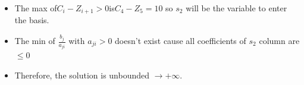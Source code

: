 \vspace{0.25cm}
\begin{itemize}   
\item The max of\hspace{0.2cm}\(C_i - Z_{i+1} > 0\)\hspace{0.2cm}is\hspace{0.2cm}\(C_4 - Z_5 = 10\)\hspace{0.1cm} so \(s_2\) 
will be the variable to enter the basis.
\item The min of \hspace{0.1cm}\(\frac{b_j}{a_{ji}}\)\hspace{0.1cm} with \(a_{ji} > 0\)\hspace{0.1cm} doesn't exist cause all coefficients of \(s_2\) column are \(\leq 0\) 
\item Therefore, the solution is unbounded \(\to +\infty\).
 
\end{itemize}


